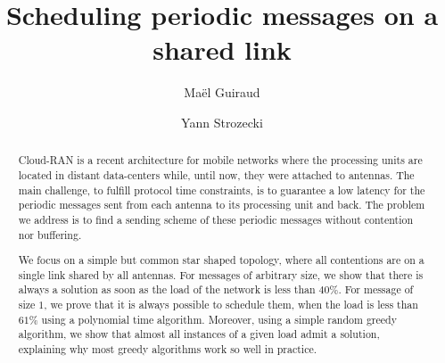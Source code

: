 \documentclass[10pt, conference, letterpaper]{algotel}
\title{Scheduling periodic messages on a shared link}
\author[1,2]{Ma\"el Guiraud}
\author[1]{Yann Strozecki}
\affil[1]{David Laboratory, UVSQ}
\affil[2]{Nokia Bell Labs France}
\begin{document}
\maketitle








\begin{abstract}
Cloud-RAN is a recent architecture for mobile networks where the processing units are located in distant data-centers while, until now, they were attached to antennas. The main challenge, to fulfill protocol time constraints, is to guarantee a low latency for the periodic messages sent from each antenna to its processing unit and back. The problem we address is to find a sending scheme of these periodic messages without contention nor buffering.

We focus on a simple but common star shaped topology, where all contentions are on a single link shared by all antennas. For messages of arbitrary size, we show that there is always a solution as soon as the load of the network is less than $40\%$.
For message of size $1$, we prove that it is always possible to schedule them, when the load is less than $61\%$  using a polynomial time algorithm. Moreover, using a simple random greedy algorithm, we show that almost all instances of a given load admit a solution, explaining why most greedy algorithms work so well in practice.  
\end{abstract}
\end{document}
